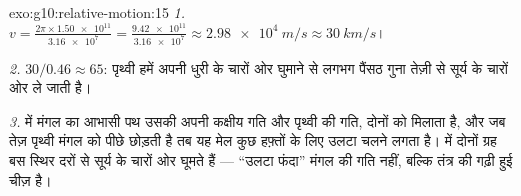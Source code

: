 \begin{solution}{exo:g10:relative-motion:15}
\emph{1.} $v = \frac{2\pi \times \num{1.50e11}}{\num{3.16e7}}
= \frac{\num{9.42e11}}{\num{3.16e7}} \approx \qty{2.98e4}{m/s}
\approx \qty{30}{km/s}$।

\emph{2.} $30 / 0.46 \approx 65$: पृथ्वी हमें अपनी धुरी के चारों ओर घुमाने से लगभग
पैंसठ गुना तेज़ी से सूर्य के चारों ओर ले जाती है।

\emph{3.}  में मंगल का आभासी पथ उसकी अपनी कक्षीय
गति और पृथ्वी की गति, दोनों को मिलाता है, और जब तेज़ पृथ्वी मंगल को पीछे
छोड़ती है तब यह मेल कुछ हफ़्तों के लिए उलटा चलने लगता है।
 में दोनों ग्रह बस स्थिर दरों से सूर्य के
चारों ओर घूमते हैं --- ``उलटा फंदा'' मंगल की गति नहीं, बल्कि तंत्र की
गढ़ी हुई चीज़ है।
\end{solution}

